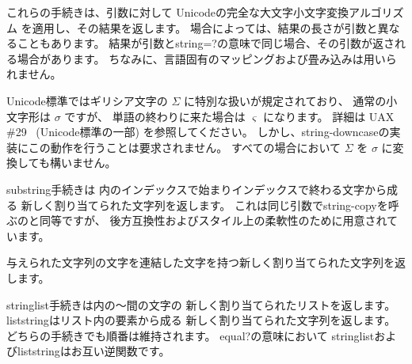 \begin{entry}{%
}


これらの手続きは、引数に対して
Unicodeの完全な大文字小文字変換アルゴリズム
を適用し、その結果を返します。
場合によっては、結果の長さが引数と異なることもあります。
結果が引数と{\cf string=?}の意味で同じ場合、その引数が返される場合があります。
ちなみに、言語固有のマッピングおよび畳み込みは用いられません。

Unicode標準ではギリシア文字の $\Sigma$ に特別な扱いが規定されており、
通常の小文字形は $\sigma$ ですが、
単語の終わりに来た場合は $\varsigma$ になります。
詳細は UAX \#29~\cite{uax29} (Unicode標準の一部) を参照してください。
しかし、{\cf string-downcase}の実装にこの動作を行うことは要求されません。
すべての場合において $\Sigma$ を $\sigma$ に変換しても構いません。

\end{entry}


\begin{entry}{%
}

{\cf substring}手続きは
内のインデックスで始まりインデックスで終わる文字から成る
新しく割り当てられた文字列を返します。
これは同じ引数で{\cf string-copy}を呼ぶのと同等ですが、
後方互換性およびスタイル上の柔軟性のために用意されています。
\end{entry}


\begin{entry}{%
}

与えられた文字列の文字を連結した文字を持つ新しく割り当てられた文字列を返します。

\end{entry}


\begin{entry}{%
}

{\cf string\coerce{}list}手続きは内の〜間の文字の
新しく割り当てられたリストを返します。
{\cf list\coerce{}string}はリスト内の要素から成る
新しく割り当てられた文字列を返します。
どちらの手続きでも順番は維持されます。
{\cf equal?}の意味において
{\cf string\coerce{}list}および{\cf list\coerce{}string}はお互い逆関数です。

\end{entry}



